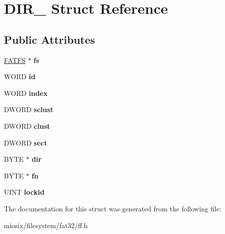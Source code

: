 \hypertarget{struct_d_i_r__}{\section{D\-I\-R\-\_\- Struct Reference}
\label{struct_d_i_r__}
}
\subsection*{Public Attributes}
\begin{DoxyCompactItemize}
\item 
\hypertarget{struct_d_i_r___a6aeaea55cb2c1c745fe0d2d3ab9ced74}{\hyperlink{struct_f_a_t_f_s}{F\-A\-T\-F\-S} $\ast$ {\bfseries fs}}\label{struct_d_i_r___a6aeaea55cb2c1c745fe0d2d3ab9ced74}

\item 
\hypertarget{struct_d_i_r___a09fb6d3b2975988ec43704f532adf41a}{W\-O\-R\-D {\bfseries id}}\label{struct_d_i_r___a09fb6d3b2975988ec43704f532adf41a}

\item 
\hypertarget{struct_d_i_r___abd2703f8c2b1acae1151195090d15062}{W\-O\-R\-D {\bfseries index}}\label{struct_d_i_r___abd2703f8c2b1acae1151195090d15062}

\item 
\hypertarget{struct_d_i_r___a49fdab12c85eac90dd69dec6b6b10ec4}{D\-W\-O\-R\-D {\bfseries sclust}}\label{struct_d_i_r___a49fdab12c85eac90dd69dec6b6b10ec4}

\item 
\hypertarget{struct_d_i_r___aa5e5933755d58a2e3244c9e148f6db15}{D\-W\-O\-R\-D {\bfseries clust}}\label{struct_d_i_r___aa5e5933755d58a2e3244c9e148f6db15}

\item 
\hypertarget{struct_d_i_r___a7ba98ec9c243eaa0aaf346f862c665e7}{D\-W\-O\-R\-D {\bfseries sect}}\label{struct_d_i_r___a7ba98ec9c243eaa0aaf346f862c665e7}

\item 
\hypertarget{struct_d_i_r___a829f6e078c141a323610e27fc72a17fe}{B\-Y\-T\-E $\ast$ {\bfseries dir}}\label{struct_d_i_r___a829f6e078c141a323610e27fc72a17fe}

\item 
\hypertarget{struct_d_i_r___a166265da0c393584320dc87a8c022d7a}{B\-Y\-T\-E $\ast$ {\bfseries fn}}\label{struct_d_i_r___a166265da0c393584320dc87a8c022d7a}

\item 
\hypertarget{struct_d_i_r___aa3ee027abb0147c99f67480f55534e59}{U\-I\-N\-T {\bfseries lockid}}\label{struct_d_i_r___aa3ee027abb0147c99f67480f55534e59}

\end{DoxyCompactItemize}


The documentation for this struct was generated from the following file\-:\begin{DoxyCompactItemize}
\item 
miosix/filesystem/fat32/ff.\-h\end{DoxyCompactItemize}
